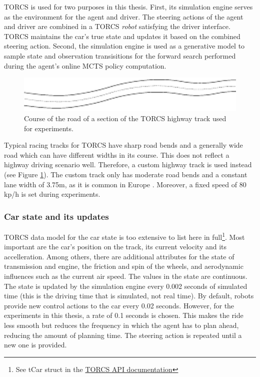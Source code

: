 TORCS is used for two purposes in this thesis. First, its simulation engine serves as the environment for the agent and driver. The steering actions of the agent and driver are combined in a TORCS \emph{robot} satisfying the driver interface. TORCS maintains the car's true state and updates it based on the combined steering action. Second, the simulation engine is used as a generative model to sample state and observation transisitions for the forward search performed during the agent's online MCTS policy computation.  
 
 
\begin{figure}[htbp]
    \centerfloat
    \includegraphics[width=1.0\textwidth]{figures/track.pdf}
    \caption{Course of the road of a section of the TORCS highway track used for experiments.}
    \label{fig:track}
\end{figure}

Typical racing tracks for TORCS have sharp road bends and a generally wide road which can have different widths in its course. This does not reflect a highway driving scenario well. Therefore, a custom highway track is used instead (see Figure \ref{fig:track}). The custom track only has moderate road bends and a constant lane width of 3.75m, as it is common in Europe \parencite{lane_width}. Moreover, a fixed speed of 80 kp/h is set during experiments.

\subsubsection{Car state and its updates}
\label{sec:state}

TORCS data model for the car state is too extensive to list here in full\footnote{See tCar struct in the \href{https://sourceforge.net/projects/torcs/files/api-docs/}{TORCS API documentation}}. Most important are the car's position on the track, its current velocity and its accelleration. Among others, there are additional attributes for the state of transmission and engine, the friction and spin of the wheels, and aerodynamic influences such as the current air speed. The values in the state are continuous. The state is updated by the simulation engine every 0.002 seconds of simulated time (this is the driving time that is simulated, not real time). By default, robots provide new control actions to the car every 0.02 seconds. However, for the experiments in this thesis, a rate of 0.1 seconds is chosen. This makes the ride less smooth but reduces the frequency in which the agent has to plan ahead, reducing the amount of planning time. The steering action is repeated until a new one is provided.

